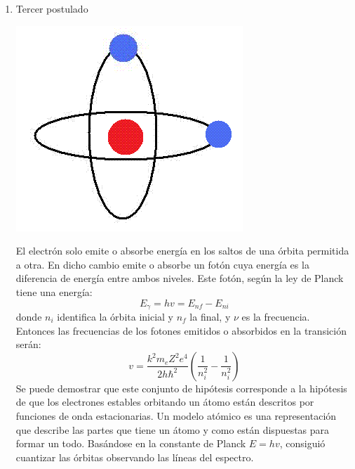 \documentclass[12pt,a4paper]{article}
\begin{document}
\begin{enumerate}
\item Tercer postulado 
\begin{multicols}{2}

\begin{center}
\includegraphics[scale=0.5]{Bohr-model3pos.png} 
\end{center}
El electrón solo emite o absorbe energía en los saltos de una órbita permitida a otra. En dicho cambio emite o absorbe un fotón cuya energía es la diferencia de energía entre ambos niveles. Este fotón, según la ley de Planck tiene una energía: $$E_{\gamma}=hv=E_{nf}-E_{ni}$$ 
    donde $n_i$ identifica la órbita inicial y $n_f$ la final, y $\nu$ es la frecuencia.\\
Entonces las frecuencias de los fotones emitidos o absorbidos en la transición serán:
$$v=\dfrac{k^{2}m_{e}Z^{2}e^{4}}{2h\hbar^{2}}\left( \dfrac{1}{n^{2}_i}-\dfrac{1}{n^{2}_{i}}\right)$$
Se puede demostrar que este conjunto de hipótesis corresponde a la hipótesis de que los electrones estables orbitando un átomo están descritos por funciones de onda estacionarias. Un modelo atómico es una representación que describe las partes que tiene un átomo y como están dispuestas para formar un todo. Basándose en la constante de Planck $E=hv$, consiguió cuantizar las órbitas observando las líneas del espectro.
\end{multicols}
\end{enumerate}
\end{document}
